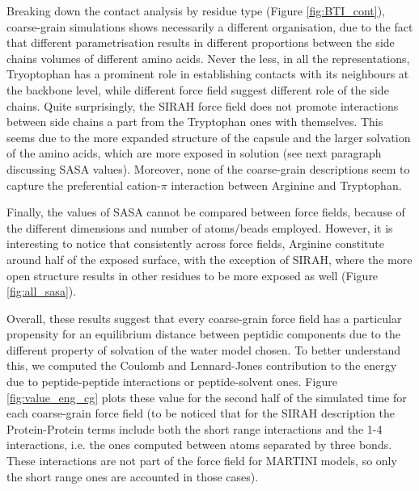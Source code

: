 Breaking down the contact analysis by residue type (Figure \ref{fig:BTI_cont}), coarse-grain simulations shows necessarily a different organisation, due to the fact that different parametrisation results in different proportions between the side chains volumes of different amino acids. Never the less, in all the representations, Tryoptophan has a prominent role in establishing contacts with its neighbours at the backbone level, while different force field suggest different role of the side chains. Quite surprisingly, the SIRAH force field does not promote interactions between side chains a part from the Tryptophan ones with themselves. This seems due to the more expanded structure of the capsule and the larger solvation of the amino acids, which are more exposed in solution (see next paragraph discussing SASA values).
%
Moreover, none of the coarse-grain descriptions seem to capture the preferential cation-$\pi$ interaction between Arginine and Tryptophan.

Finally, the values of SASA cannot be compared between force fields, because of the different dimensions and number of atoms/beads employed. However, it is interesting to notice that consistently across force fields, Arginine constitute around half of the exposed surface, with the exception of SIRAH, where the more open structure results in other residues to be more exposed as well (Figure \ref{fig:all_sasa}).

Overall, these results suggest that every coarse-grain force field has a particular propensity for an equilibrium distance between peptidic components due to the different property of solvation of the water model chosen. To better understand this, we computed the Coulomb and Lennard-Jones contribution to the energy due to peptide-peptide interactions or peptide-solvent ones.
%
Figure \ref{fig:value_eng_cg} plots these value for the second half of the simulated time for each coarse-grain force field (to be noticed that for the SIRAH description the Protein-Protein terms include both the short range interactions and the 1-4 interactions, i.e. the ones computed between atoms separated by three bonds. These interactions are not part of the force field for MARTINI models, so only the short range ones are accounted in those cases).

